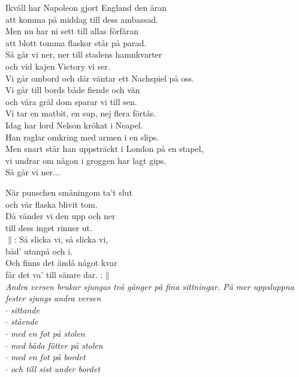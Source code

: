 \documentclass[a6paper,10pt]{article}
\begin{document}
\setlength{\oddsidemargin}{-0.37in}
\noindent
\begin{center}
\end{center}
Ikväll har Napoleon gjort England den äran\\
att komma på middag till dess ambassad.\\
Men nu har ni sett till allas förfäran\\
att blott tomma flaskor står på parad.
\vspace{5pt}\\
Så går vi ner, ner till stadens hamnkvarter\\
och vid kajen Victory vi ser.\\
Vi går ombord och där väntar ett Nachspiel på oss.\\
Vi går till bords både fiende och vän\\
och våra gräl dom sparar vi till sen.\\
Vi tar en matbit, en sup, nej flera förtås.
\vspace{5pt}\\
Idag har lord Nelson krökat i Neapel.\\
Han raglar omkring med armen i en slips.\\
Men snart står han uppsträckt i London på en stapel,\\
vi undrar om någon i groggen har lagt gips.
\vspace{5pt}\\
Så går vi ner...

\setlength{\oddsidemargin}{-0.47in}
\noindent
\begin{center}
\end{center}
När punschen småningom ta't slut\\
och vår flaska blivit tom.\\
Då vänder vi den upp och ner\\
till dess inget rinner ut.
\vspace{5pt}\\
$\|$: Så slicka vi, så slicka vi,\\
båd' utanpå och i.\\
Och finns det ändå något kvar\\
får det va' till sämre dar. :$\|$
\vspace{10pt}\\
\textit{Andra versen brukar sjungas två gånger på fina sittningar. På mer uppsluppna fester sjungs andra versen\\
$\cdot$ sittande\\
$\cdot$ stående\\
$\cdot$ med en fot på stolen\\
$\cdot$ med båda fötter på stolen\\
$\cdot$ med en fot på bordet\\
$\cdot$ och till sist under bordet}
\end{document}
